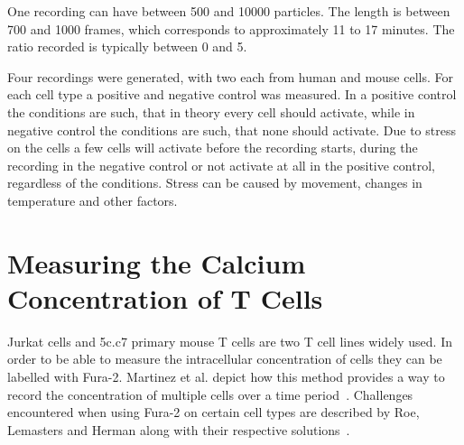
One recording can have between 500 and 10000 particles. The length is between 700 and 1000 frames, which corresponds to approximately 11 to 17 minutes. The ratio recorded is typically between 0 and 5.

Four recordings were generated, with two each from human and mouse cells. For each cell type a positive and negative control was measured. In a positive control the conditions are such, that in theory every cell should activate, while in negative control the conditions are such, that none should activate. Due to stress on the cells a few cells will activate before the recording starts, during the recording in the negative control or not activate at all in the positive control, regardless of the conditions. Stress can be caused by movement, changes in temperature and other factors.



\section{Measuring the Calcium Concentration of T Cells}

Jurkat cells and 5c.c7 primary mouse T cells are two T cell lines widely used.
In order to be able to measure the intracellular \Calcium concentration of cells they can be labelled with Fura-2. Martinez et al. depict how this method provides a way to record the \Calcium concentration of multiple cells over a time period~\cite{martinez2017}. Challenges encountered when using Fura-2 on certain cell types are described by Roe, Lemasters and Herman along with their respective solutions~\cite{roe1990}.

